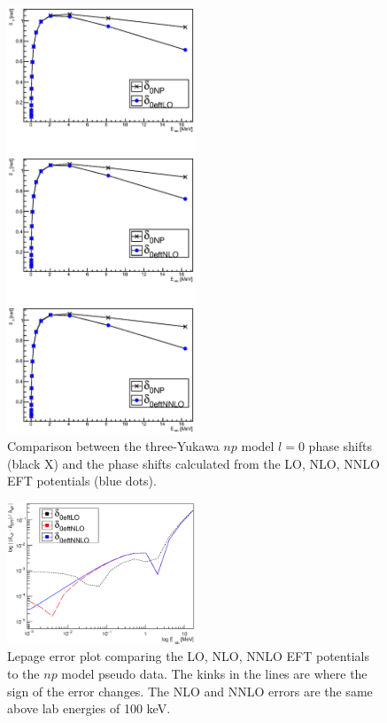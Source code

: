 \documentclass[10pt,showpacs,preprintnumbers,footinbib,amsmath,amssymb,aps,prl,twocolumn,groupedaddress,superscriptaddress,showkeys]{revtex4-1}
\begin{document}
\begin{figure}
\centering
	\includegraphics[width=0.5\textwidth]{figures/phy989_pionless.eps}
	\caption{Comparison between the three-Yukawa $np$ model $l=0$ phase shifts
	(black X)
	and the phase shifts calculated from the LO, NLO, NNLO EFT potentials (blue
	dots).}
	\label{fig:pionless}
\end{figure}

\begin{figure}
\centering
	\includegraphics[width=0.5\textwidth]{figures/phy989_pionlessLepage.eps}
	\caption{Lepage error plot comparing the LO, NLO, NNLO EFT potentials to the
	$np$ model pseudo data. The kinks in the lines are where the sign of the error
	changes. The NLO and NNLO errors are the same above lab energies of 100
	keV.}
	\label{fig:pionlessLepage}
\end{figure}
\end{document}
